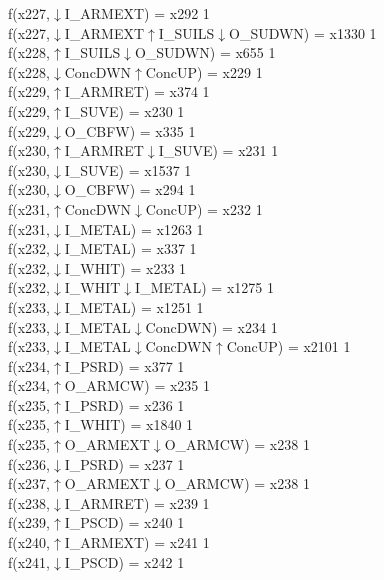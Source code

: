 f(x227,$\downarrow$I\_ARMEXT) = x292 {1} \\
f(x227,$\downarrow$I\_ARMEXT$\uparrow$I\_SUILS$\downarrow$O\_SUDWN) = x1330 {1} \\
f(x228,$\uparrow$I\_SUILS$\downarrow$O\_SUDWN) = x655 {1} \\
f(x228,$\downarrow$ConcDWN$\uparrow$ConcUP) = x229 {1} \\
f(x229,$\uparrow$I\_ARMRET) = x374 {1} \\
f(x229,$\uparrow$I\_SUVE) = x230 {1} \\
f(x229,$\downarrow$O\_CBFW) = x335 {1} \\
f(x230,$\uparrow$I\_ARMRET$\downarrow$I\_SUVE) = x231 {1} \\
f(x230,$\downarrow$I\_SUVE) = x1537 {1} \\
f(x230,$\downarrow$O\_CBFW) = x294 {1} \\
f(x231,$\uparrow$ConcDWN$\downarrow$ConcUP) = x232 {1} \\
f(x231,$\downarrow$I\_METAL) = x1263 {1} \\
f(x232,$\downarrow$I\_METAL) = x337 {1} \\
f(x232,$\downarrow$I\_WHIT) = x233 {1} \\
f(x232,$\downarrow$I\_WHIT$\downarrow$I\_METAL) = x1275 {1} \\
f(x233,$\downarrow$I\_METAL) = x1251 {1} \\
f(x233,$\downarrow$I\_METAL$\downarrow$ConcDWN) = x234 {1} \\
f(x233,$\downarrow$I\_METAL$\downarrow$ConcDWN$\uparrow$ConcUP) = x2101 {1} \\
f(x234,$\uparrow$I\_PSRD) = x377 {1} \\
f(x234,$\uparrow$O\_ARMCW) = x235 {1} \\
f(x235,$\uparrow$I\_PSRD) = x236 {1} \\
f(x235,$\uparrow$I\_WHIT) = x1840 {1} \\
f(x235,$\uparrow$O\_ARMEXT$\downarrow$O\_ARMCW) = x238 {1} \\
f(x236,$\downarrow$I\_PSRD) = x237 {1} \\
f(x237,$\uparrow$O\_ARMEXT$\downarrow$O\_ARMCW) = x238 {1} \\
f(x238,$\downarrow$I\_ARMRET) = x239 {1} \\
f(x239,$\uparrow$I\_PSCD) = x240 {1} \\
f(x240,$\uparrow$I\_ARMEXT) = x241 {1} \\
f(x241,$\downarrow$I\_PSCD) = x242 {1} \\
